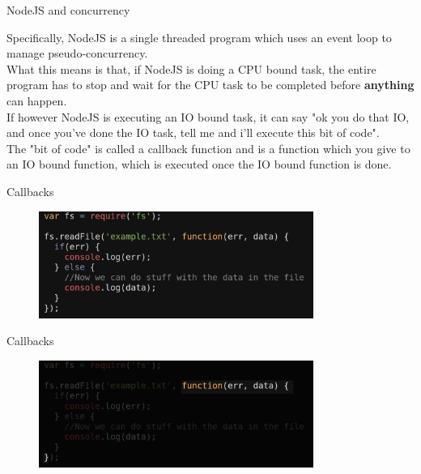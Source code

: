 \documentclass{beamer}
\begin{document}
\begin{frame}{NodeJS and concurrency}

Specifically, NodeJS is a single threaded program which uses an event loop to manage pseudo-concurrency. \\
\pause
What this means is that, if NodeJS is doing a CPU bound task, the entire program has to stop and wait for the CPU task to be completed before \textbf{anything} can happen.\\
\pause
If however NodeJS is executing an IO bound task, it can say "ok you do that IO, and once you've done the IO task, tell me and i'll execute this bit of code".\\
\pause
The "bit of code" is called a callback function and is a function which you give to an IO bound function, which is executed once the IO bound function is done.

\end{frame}

\begin{frame}{Callbacks}

\begin{figure}[h]
\includegraphics[width=0.8\textwidth]{fscode}
\end{figure}

\end{frame}

\begin{frame}{Callbacks}

\begin{figure}[h]
\includegraphics[width=0.8\textwidth]{fscode2}
\end{figure}

\end{frame}
\end{document}
